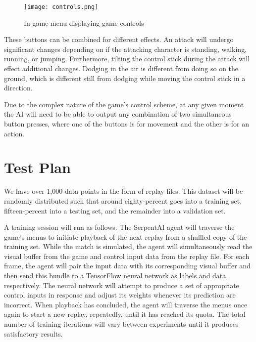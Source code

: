\begin{figure}
	\caption{In-game menu displaying game controls}
	\centering
	\texttt{[image: controls.png]} \\
\end{figure}

These buttons can be combined for different effects. An attack will undergo significant changes depending on if the attacking character is standing, walking, running, or jumping. Furthermore, tilting the control stick during the attack will effect additional changes. Dodging in the air is different from doing so on the ground, which is different still from dodging while moving the control stick in a direction.

Due to the complex nature of the game's control scheme, at any given moment the AI will need to be able to output any combination of two simultaneous button presses, where one of the buttons is for movement and the other is for an action.




\section{Test Plan}

We have over 1,000 data points in the form of replay files. This dataset will be randomly distributed such that around eighty-percent goes into a training set, fifteen-percent into a testing set, and the remainder into a validation set.

A training session will run as follows. The SerpentAI agent will traverse the game's menus to initiate playback of the next replay from a shuffled copy of the training set. While the match is simulated, the agent will simultaneously read the visual buffer from the game and control input data from the replay file. For each frame, the agent will pair the input data with its corresponding visual buffer and then send this bundle to a TensorFlow neural network as labels and data, respectively. The neural network will attempt to produce a set of appropriate control inputs in response and adjust its weights  whenever its prediction are incorrect. When playback has concluded, the agent will traverse the menus once again to start a new replay, repeatedly, until it has reached its quota. The total number of training iterations will vary between experiments until it produces satisfactory results.

